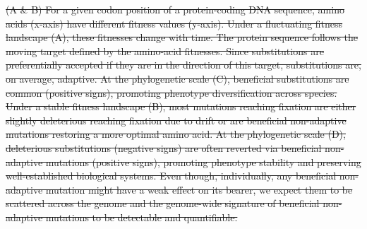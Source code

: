\documentclass{article} %
\providecommand{\DIFdeltex}[1]{{\protect\color{red}\sout{#1}}}                      %
\providecommand{\DIFdelbegin}{} %
\providecommand{\DIFdelFL}[1]{\DIFdel{#1}} %
\providecommand{\DIFdel}[1]{\texorpdfstring{\DIFdeltex{#1}}{}} %
\newcommand{\DIFscaledelfig}{0.5}
\newlength{\DIFdelgraphicswidth} %
\newlength{\DIFdelgraphicsheight} %
\newcommand{\DIFdelincludegraphics}[2][]{%
\sbox{\DIFdelgraphicsbox}{\DIFOincludegraphics[#1]{#2}}%
\settoboxwidth{\DIFdelgraphicswidth}{\DIFdelgraphicsbox} %
\settoboxtotalheight{\DIFdelgraphicsheight}{\DIFdelgraphicsbox} %
\scalebox{\DIFscaledelfig}{%
\parbox[b]{\DIFdelgraphicswidth}{\usebox{\DIFdelgraphicsbox}\\[-\baselineskip] \rule{\DIFdelgraphicswidth}{0em}}\llap{\resizebox{\DIFdelgraphicswidth}{\DIFdelgraphicsheight}{%
\setlength{\unitlength}{\DIFdelgraphicswidth}%
\begin{picture}(1,1)%
\thicklines\linethickness{2pt} %
{\color[rgb]{1,0,0}\put(0,0){\framebox(1,1){}}}%
{\color[rgb]{1,0,0}\put(0,0){\line( 1,1){1}}}%
{\color[rgb]{1,0,0}\put(0,1){\line(1,-1){1}}}%
\end{picture}%
}\hspace*{3pt}}} %
} %
\DeclareRobustCommand{\DIFdelbegin}{\DIFOdelbegin \let\includegraphics\DIFdelincludegraphics} %
\begin{document}
    \DIFdelbegin %
{%
\DIFdelFL{(A \& B) For a given codon position of a protein-coding DNA sequence, amino acids (x-axis) have different fitness values (y-axis).
              Under a fluctuating fitness landscape (A), these fitnesses change with time.
              The protein sequence follows the moving target defined by the amino-acid fitnesses. Since substitutions are preferentially accepted if they are in the direction of this target, substitutions are, on average, adaptive.
              At the phylogenetic scale (C), beneficial substitutions are common (positive signs), promoting phenotype diversification across species.
              Under a stable fitness landscape (B), most mutations reaching fixation are either slightly deleterious reaching fixation due to drift or are beneficial non-adaptive mutations restoring a more optimal amino acid.
              At the phylogenetic scale (D), deleterious substitutions (negative signs) are often reverted via beneficial non-adaptive mutations (positive signs), promoting phenotype stability and preserving well-established biological systems.
              Even though, individually, any beneficial non-adaptive mutation might have a weak effect on its bearer, we expect them to be scattered across the genome and the genome-wide signature of beneficial non-adaptive mutations to be detectable and quantifiable.}}
\end{document}
